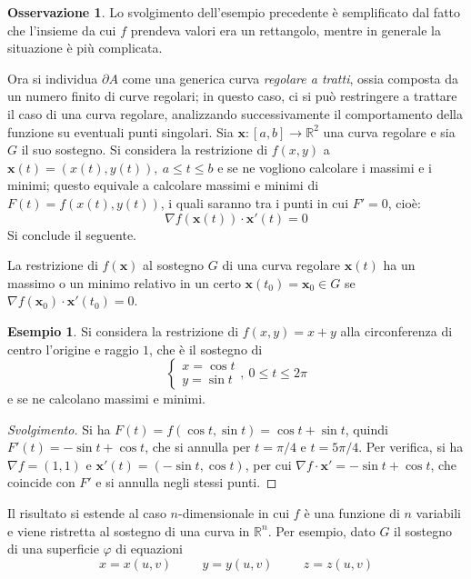 \documentclass[11pt, a4paper]{scrartcl}
\newenvironment{svolgimento}{\renewcommand\qedsymbol{$\blacksquare$}\begin{proof}[Svolgimento]}{\end{proof}}
\theoremstyle{definition}
\newtheorem{esempio}{Esempio}
\numberwithin{esempio}{section}
\theoremstyle{definition}
\newtheorem{obs}{Osservazione}
\numberwithin{obs}{section}
\numberwithin{nota}{section}
\numberwithin{equation}{subsection}
\begin{document}
\begin{obs}
Lo svolgimento dell'esempio precedente \`e semplificato dal fatto che l'insieme da cui $f$ prendeva valori era un rettangolo, mentre in generale la situazione \`e pi\`u complicata.
\end{obs}
Ora si individua $\partial A$ come una generica curva \textit{regolare a tratti}, ossia composta da un numero finito di curve regolari; in questo caso, ci si pu\`o restringere a trattare il caso di una curva regolare, analizzando successivamente il comportamento della funzione su eventuali punti singolari.
Sia $\mathbf{x} : \left[ a,b \right] \to \mathbb{R}^2$ una curva regolare e sia $G$ il suo sostegno. 
Si considera la restrizione di $f(x,y)$ a $\mathbf{x}(t) = (x(t),y(t)), \ a\le t\le b$ e se ne vogliono calcolare i massimi e i minimi; questo equivale a calcolare massimi e minimi di $F(t) = f(x(t), y(t))$, i quali saranno tra i punti in cui $F' = 0$, cio\`e:
\[
\nabla f(\mathbf{x} (t)) \cdot \mathbf{x} '(t) = 0 
\] 
Si conclude il seguente.
\begin{teorema}
	{}{}
	La restrizione di $f(\mathbf{x} )$ al sostegno $G$ di una curva regolare $\mathbf{x} (t)$ ha un massimo o un minimo relativo in un certo $\mathbf{x} (t_0) = \mathbf{x} _0 \in G$ se $\nabla f(\mathbf{x} _0) \cdot \mathbf{x} '(t_0) = 0 $.
\end{teorema}
\begin{esempio}
Si considera la restrizione di $f(x,y)=x+y$ alla circonferenza di centro l'origine e raggio $1$, che \`e il sostegno di 
\[
\begin{cases}
	x =\cos t\\
	y= \sin t
\end{cases}, \  0\le t \le  2\pi
\] 
e se ne calcolano massimi e minimi.
\begin{svolgimento}
Si ha $F(t) = f(\cos t, \sin t) = \cos t + \sin t$, quindi $F' (t) = - \sin t + \cos t$, che si annulla per $t = \pi / 4$  e $t =  5 \pi /4$.
Per verifica, si ha $\nabla f = (1,1)$ e $\mathbf{x}' (t) = (-\sin t, \cos t)$, per cui $\nabla f \cdot \mathbf{x} ' = - \sin t + \cos t$, che coincide con $F'$ e si annulla negli stessi punti.
\end{svolgimento}
\end{esempio}
Il risultato si estende al caso $n$-dimensionale in cui $f$ \`e una funzione di $n$ variabili e viene ristretta al sostegno di una curva in $\mathbb{R}^n$.
Per esempio, dato $G$ il sostegno di una superficie $\varphi $ di equazioni
\[
	x = x(u,v) \hspace{1cm} y = y(u,v)  \hspace{1cm} z = z(u,v)
\] 
\end{document}
